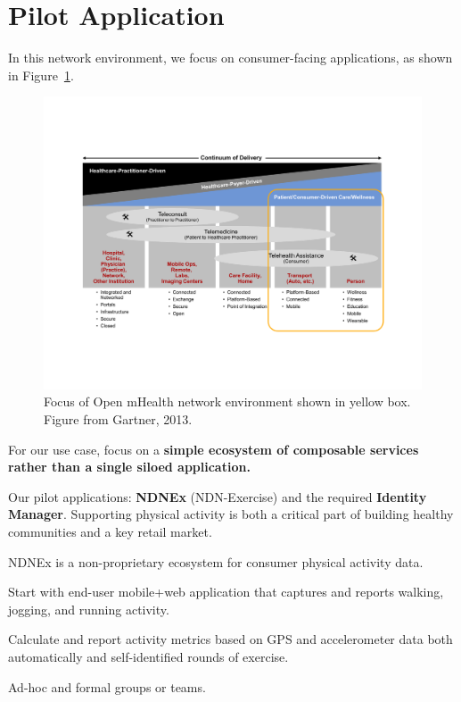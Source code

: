 \section{Pilot Application}

In this network environment, we focus on consumer-facing applications, as shown in Figure~\ref{fig:continuum}. 

\begin{figure}
\begin{center}
\includegraphics[width=.8\textwidth]{figures/continuum}
\caption{{Focus of Open mHealth network environment shown in yellow box. Figure from Gartner, 2013.  }}
\label{fig:continuum}
\end{center}
\end{figure}

For our use case, focus on a \textbf{simple ecosystem of composable services rather than a single siloed application.}

Our pilot applications:  \textbf{NDNEx} (NDN-Exercise) and the required \textbf{Identity Manager}.  Supporting physical activity is both a critical part of building healthy communities and a key retail market. 

NDNEx is a non-proprietary ecosystem for consumer physical activity data. 

Start with end-user mobile+web application that captures and reports walking, jogging, and running activity.

Calculate and report activity metrics based on GPS and accelerometer data  both automatically and self-identified rounds of exercise.  

Ad-hoc and formal groups or teams. 

